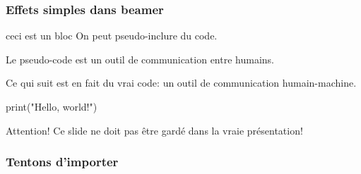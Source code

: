\documentclass{beamer}
\begin{document}
\begin{frame}
  \frametitle{Effets simples dans beamer}
  \begin{block}{ceci est un bloc}
    On peut pseudo-inclure du code.
  \end{block}
  \begin{definition}
    Le pseudo-code est un outil de communication entre humains.
  \end{definition}
  \begin{example}
    Ce qui suit est en fait du vrai code: un outil de communication humain-machine.
  \end{example}
  \begin{semiverbatim}
    print("Hello, world!")
  \end{semiverbatim}
  \begin{alertblock}{Attention!}
    Ce slide ne doit pas être gardé dans la vraie présentation!
  \end{alertblock}
\end{frame}

\begin{frame}
  \frametitle{Tentons d'importer}
  \begin{minipage}{.4\textwidth}    
  \end{minipage}
  \quad
  \begin{minipage}{.4\textwidth}
    \par\medskip
  \end{minipage}
\end{frame}
\end{document}

